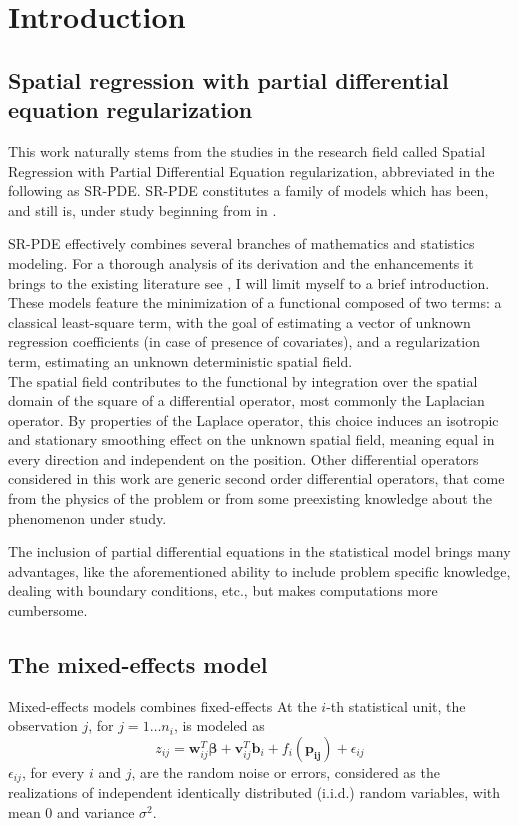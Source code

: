 
\chapter{Introduction}
\label{ch:intro}

\section{Spatial regression with partial differential equation regularization}
This work naturally stems from the studies in the research field called Spatial Regression with Partial Differential Equation regularization, abbreviated in the following as SR-PDE. SR-PDE constitutes a family of models which has been, and still is, under study beginning from \citeyear{sangalli0} in \citeauthor{sangalli0} \cite{sangalli0}.

SR-PDE effectively combines several branches of mathematics and statistics modeling. For a thorough analysis of its derivation and the enhancements it brings to the existing literature see \cite{sangalli1}, I will limit myself to a brief introduction.\\
These models feature the minimization of a functional composed of two terms: a classical least-square term, with the goal of estimating a vector of unknown regression coefficients (in case of presence of covariates), and a regularization term, estimating an unknown deterministic spatial field.\\
The spatial field contributes to the functional by integration over the spatial domain of the square of a differential operator, most commonly the Laplacian operator. By properties of the Laplace operator, this choice induces an isotropic and stationary smoothing effect on the unknown spatial field, meaning equal in every direction and independent on the position. Other differential operators considered in this work are generic second order differential operators, that come from the physics of the problem or from some preexisting knowledge about the phenomenon under study. 

The inclusion of partial differential equations in the statistical model brings many advantages, like the aforementioned ability to include problem specific knowledge, dealing with boundary conditions, etc., but makes computations more cumbersome. 

\section{The mixed-effects model}
Mixed-effects models combines fixed-effects 
At the $i$-th statistical unit, the observation $j$, for $j = 1 \dots n_i$, is modeled as
\begin{equation}
    \label{model}
    z_{ij} = \bm{w}_{ij}^T \bm{\beta} + \bm{v}_{ij}^T \bm{b}_i + f_i(\bm{p_{ij}}) + \epsilon_{ij}
\end{equation}
$\epsilon_{ij}$, for every $i$ and $j$, are the random noise or errors, considered as the realizations of independent identically distributed (i.i.d.) random variables, with mean $0$ and variance $\sigma^2$. 